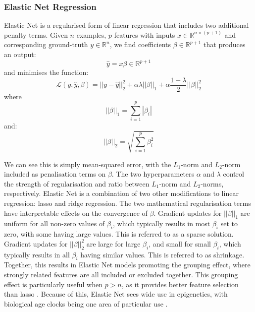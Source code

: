 \documentclass{article}
\begin{document}
\subsubsection{Elastic Net Regression}
Elastic Net \cite{zou2005regularization} is a regularised form of linear regression that includes two additional penalty terms.
Given \(n\) examples, \(p\) features with inputs \(x \in \mathbb{R}^{n \times (p + 1)}\) and corresponding ground-truth \(y \in \mathbb{R}^n\), we find coefficients \(\beta \in \mathbb{R}^{p + 1}\) that produces an output:
\[\hat{y} = x \beta \in \mathbb{R}^{p + 1}\]
and minimises the function:
\[\mathcal{L}(y, \hat{y}, \beta) = ||y - \hat{y}||_2^2 + \alpha\lambda||\beta||_1 + \alpha\frac{1 - \lambda}{2}||\beta||_2^2\]
where
\[||\beta||_1 = \sum_{i=1}^{p} |\beta_i|\]
and:
\[||\beta||_2 = \sqrt{\sum_{i=1}^{p} \beta_i^2}\]

We can see this is simply mean-squared error, with the \(L_1\)-norm and \(L_2\)-norm included as penalisation terms on \(\beta\). The two hyperparameters \(\alpha\) and \(\lambda\) control the strength of regularisation and ratio between \(L_1\)-norm and \(L_2\)-norms, respectively. Elastic Net is a combination of two other modifications to linear regression: lasso \cite{tibshirani1996regression} and ridge \cite{hoerl1970ridge} regression. The two mathematical regularisation terms have interpretable effects on the convergence of \(\beta\). Gradient updates for \(||\beta||_1\) are uniform for all non-zero values of \(\beta_i\), which typically results in most \(\beta_i\) set to zero, with some having large values. This is referred to as a sparse solution. Gradient updates for \(||\beta||_2^2\) are large for large \(\beta_i\), and small for small \(\beta_i\), which typically results in all \(\beta_i\) having similar values. This is referred to as shrinkage. Together, this results in Elastic Net models promoting the grouping effect, where strongly related features are all included or excluded together. This grouping effect is particularly useful when \(p > n\), as it provides better feature selection than lasso \cite{zou2005regularization}. Because of this, Elastic Net sees wide use in epigenetics, with biological age clocks being one area of particular use \cite{teschendorff2025epigenetic}.
\end{document}
